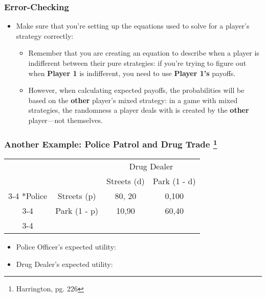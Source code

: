 % 
% 

\begin{frame}
\frametitle{Error-Checking}
\begin{itemize}
	\item Make sure that you're setting up the equations used to solve for a player's strategy correctly:
	\begin{itemize}
		\item Remember that you are creating an equation to describe when a player is indifferent between their pure strategies: if you're trying to figure out when \textbf{Player 1} is indifferent, you need to use \textbf{Player 1's} payoffs.
		\item However, when calculating expected payoffs, the probabilities will be based on the \textbf{other} player's mixed strategy: in a game with mixed strategies, the randomness a player deals with is created by the \textbf{other} player---not themselves.
	\end{itemize}
\end{itemize}
\end{frame}

\begin{frame}
\frametitle{Another Example: Police Patrol and Drug Trade
  \footnote{Harrington, pg. 226}}
\begin{table}[h]
	\centering
	\begin{tabular}{cc|c|c|}
		& \multicolumn{1}{c}{} & \multicolumn{2}{c}{Drug Dealer}\\
		& \multicolumn{1}{c}{} & \multicolumn{1}{c}{Streets (d)}  & \multicolumn{1}{c}{Park (1 - d)} \\\cline{3-4}
		\multirow{2}*{Police}  & Streets (p) & 80, 20 & 0,100 \\\cline{3-4}
		& Park (1 - p) & 10,90 & 60,40 \\\cline{3-4}
	\end{tabular}
\end{table}
\begin{itemize}
	\item Police Officer's expected utility:
  \vspace{15mm}
	\item Drug Dealer's expected utility:
\end{itemize}
\end{frame}

